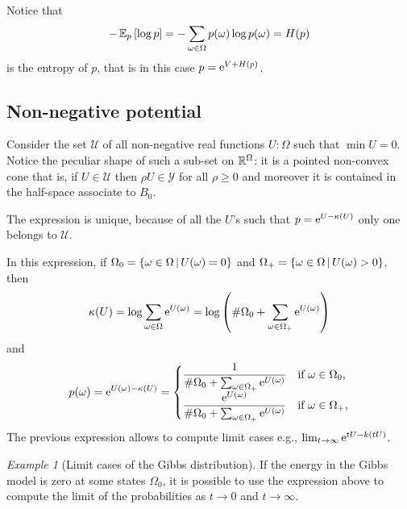 \documentclass[12pt,a4paper]{amsart}
\theoremstyle{plain}%
\theoremstyle{definition}
\theoremstyle{remark}
\newtheorem{example}{Example}
\begin{document}
Notice that
\begin{equation*}
  - \operatorname{\mathbb E}_{p}\left[\log p\right] = - \sum_{\omega\in\Omega} p(\omega) \log p(\omega) = H(p)
\end{equation*}
is the entropy of $p$, that is in this case $p = \mathrm{e}^{V + H(p)}$.

\subsection{Non-negative potential}
\label{sec:non-negat-potent}

Consider the set $\mathcal U$ of all non-negative real functions $U : \Omega$ such that $\min U = 0$. Notice the peculiar shape of such a sub-set on $\mathbb{R}^\Omega$: it is a pointed non-convex cone that is, if $U \in \mathcal U$ then $\rho U \in \mathcal Y$ for all $\rho \geq 0$ and moreover it is contained in the half-space associate to $B_0$.

The expression is unique, because of all the $U$'s such that $p = \mathrm{e}^{U-\kappa(U)}$ only one belongs to $\mathcal U$.
  
In this expression, if $\Omega_0 = \left\{\omega \in \Omega \, \middle| \, U(\omega)=0 \right\}$ and $\Omega_+ = \left\{\omega \in \Omega \, \middle| \, U(\omega) > 0 \right\}$, then
  \begin{equation*}
 \kappa(U) = \log \sum_{\omega\in\Omega} \mathrm{e}^{U(\omega)} = \log\left(\# \Omega_0 + \sum_{\omega\in\Omega_+} \mathrm{e}^{U(\omega)}\right)  
  \end{equation*}
and
\begin{equation*}
    p(\omega) = \mathrm{e}^{U(\omega) - \kappa(U)} =
    \begin{cases}
      \dfrac1{\# \Omega_0 + \sum_{\omega\in\Omega_+} \mathrm{e}^{U(\omega)}} &\text{if $\omega \in \Omega_0$,} \\
      \dfrac{\mathrm{e}^{U(\omega)}}{ \# \Omega_0 + \sum_{\omega\in\Omega_+} \mathrm{e}^{U(\omega)}} &\text{if $\omega \in \Omega_+$,} \end{cases}
\end{equation*}
The previous expression allows to compute limit cases e.g., $\lim_{t \to \infty} \mathrm{e}^{tU - k(tU)}$.

\begin{example}[Limit cases of the Gibbs distribution]
If the energy in the Gibbs model is zero at some states $\Omega_0$, it is possible to use the expression above to compute the limit of the probabilities as $t \to 0$ and $t \to \infty$.  
\end{example}
\end{document}

